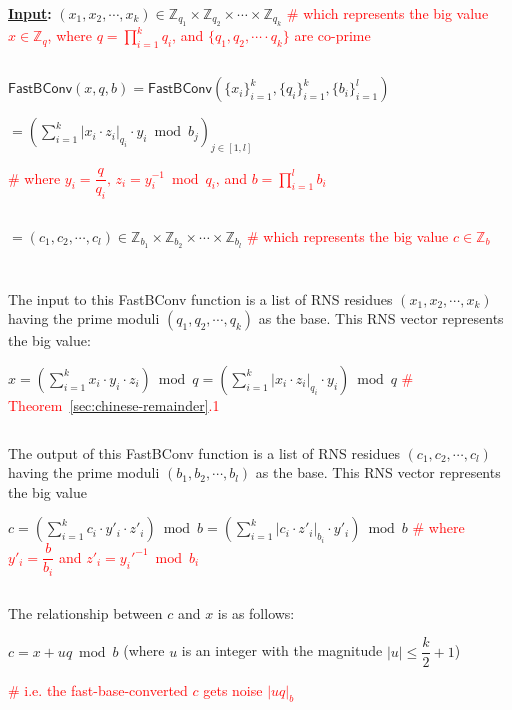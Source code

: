\begin{tcolorbox}[title={\textbf{\tboxlabel{\ref*{subsec:rns-fastbconv}} Fast Base Conversion: \textsf{FastBConv}}}]


\textbf{\underline{Input}:} $(x_1, x_2, \cdots, x_k) \in \mathbb{Z}_{q_1} \times \mathbb{Z}_{q_2} \times \cdots \times \mathbb{Z}_{q_k}$ \textcolor{red}{ \# which represents the big value $x \in \mathbb{Z}_q$, where $q = \prod\limits_{i=1}^kq_i$, and $\{q_1, q_2, \cdots \cdot q_k\}$ are co-prime}

$ $

$\textsf{FastBConv}(x, q, b)= \textsf{FastBConv}(\{x_i\}_{i=1}^{k}, \{q_i\}_{i=1}^{k}, \{b_i\}_{i=1}^{l})$

$ = \left( \sum\limits_{i=1}^{k} |x_i \cdot z_i|_{q_i} \cdot y_i \bmod b_j \right)_{j \in [1,l]}$  

\textcolor{red}{ \# where $y_i = \dfrac{q}{q_i} \text{, } z_i = y_i^{-1} \bmod q_i$, and $b = \prod\limits_{i=1}^lb_i$} 

$ $

$ = (c_1, c_2, \cdots, c_l) \in \mathbb{Z}_{b_1} \times \mathbb{Z}_{b_2} \times \cdots \times \mathbb{Z}_{b_l}$ \textcolor{red}{ \# which represents the big value $c \in \mathbb{Z}_b$}

$ $

$ $

The input to this \textsf{FastBConv} function is a list of RNS residues $(x_1, x_2, \cdots, x_k)$ having the prime moduli $(q_1, q_2, \cdots, q_k)$ as the base. This RNS vector represents the big value:

$x = \left(\sum\limits_{i=1}^k x_i\cdot y_i \cdot z_i\right) \bmod q = \left(\sum\limits_{i=1}^k |x_i\cdot z_i|_{q_i} \cdot y_i\right) \bmod q$ \textcolor{red}{ \# Theorem~\ref*{sec:chinese-remainder}.1}

$ $

The output of this \textsf{FastBConv} function is a list of RNS residues $(c_1, c_2, \cdots, c_l)$ having the prime moduli $(b_1, b_2, \cdots, b_l)$ as the base. This RNS vector represents the big value 

$c = \left(\sum\limits_{i=1}^k c_i\cdot y'_i \cdot z'_i\right) \bmod b = \left(\sum\limits_{i=1}^k |c_i\cdot z'_i|_{b_i} \cdot y'_i\right) \bmod b$ \textcolor{red}{ \# where $y'_i = \dfrac{b}{b_i}$ and $z'_i = {y_{i}'}^{-1} \bmod b_i$}

$ $

The relationship between $c$ and $x$ is as follows: 

$c = x + uq \bmod b$ (where $u$ is an integer with the magnitude $|u| \leq \dfrac{k}{2} + 1$) 

\textcolor{red}{ \# i.e. the fast-base-converted $c$ gets noise $|uq|_b$}


\end{tcolorbox}


